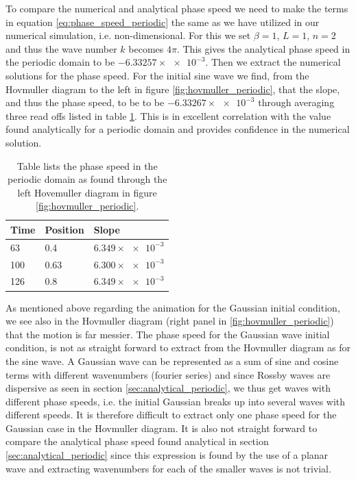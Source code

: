 \documentclass[12pt]{article}
\numberwithin{figure}{section}
\numberwithin{table}{section}
\begin{document}
\noindent To compare the numerical and analytical phase speed we need to make the terms in equation \eqref{eq:phase_speed_periodic} the same as we have utilized in our numerical simulation, i.e. non-dimensional. For this we set $\beta=1$, $L=1$, $n=2$ and thus the wave number $k$ becomes $4\pi$. This gives the analytical phase speed in the periodic domain to be $-6.33257\times \num{e-3}$. Then we extract the numerical solutions for the phase speed. For the initial sine wave we find, from the Hovmuller diagram to the left in figure \ref{fig:hovmuller_periodic}, that the slope, and thus the phase speed, to be to be $-6.33267 \times \num{e-3}$ through averaging three read offs listed in table \ref{tab:sin_phase}. This is in excellent correlation with the value found analytically for a periodic domain and provides confidence in the numerical solution.\\

\begin{table}[ht]
\begin{center}
\caption{Table lists the phase speed in the periodic domain as found through the left Hovemuller diagram in figure \ref{fig:hovmuller_periodic}.}
  \begin{tabular}{| l | l | l |}
  \hline
    Time &  Position & Slope \\ \hline\hline
     63 & 0.4 & $6.349\times \num{e-3}$ \\
      100 & 0.63 & $6.300\times \num{e-3}$ \\
     126 & 0.8 & $6.349\times \num{e-3}$ \\ \hline
  \end{tabular}
\end{center}
\label{tab:sin_phase}
\end{table}

\noindent As mentioned above regarding the animation for the Gaussian initial condition, we see also in the Hovmuller diagram (right panel in \ref{fig:hovmuller_periodic}) that the motion is far messier. The phase speed for the Gaussian wave initial condition, is not as straight forward to extract from the Hovmuller diagram as for the sine wave. A Gaussian wave can be represented as a sum of sine and cosine terms with different wavenumbers (fourier series) and since Rossby waves are dispersive as seen in section \ref{sec:analytical_periodic}, we thus get waves with different phase speeds, i.e. the initial Gaussian breaks up into several waves with different speeds. It is therefore difficult to extract only one phase speed for the Gaussian case in the Hovmuller diagram. It is also not straight forward to compare the analytical phase speed found analytical in section \ref{sec:analytical_periodic} since this expression is found by the use of a planar wave and extracting wavenumbers for each of the smaller waves is not trivial. \\
\end{document}
